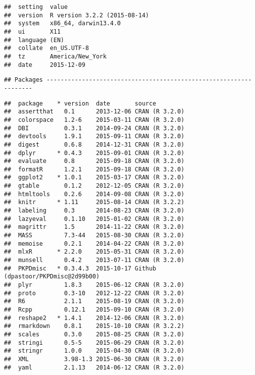 \documentclass[]{article}
\begin{document}
\begin{verbatim}
##  setting  value                       
##  version  R version 3.2.2 (2015-08-14)
##  system   x86_64, darwin13.4.0        
##  ui       X11                         
##  language (EN)                        
##  collate  en_US.UTF-8                 
##  tz       America/New_York            
##  date     2015-12-09
\end{verbatim}

\begin{verbatim}
## Packages ------------------------------------------------------------------
\end{verbatim}

\begin{verbatim}
##  package    * version  date       source                            
##  assertthat   0.1      2013-12-06 CRAN (R 3.2.0)                    
##  colorspace   1.2-6    2015-03-11 CRAN (R 3.2.0)                    
##  DBI          0.3.1    2014-09-24 CRAN (R 3.2.0)                    
##  devtools     1.9.1    2015-09-11 CRAN (R 3.2.0)                    
##  digest       0.6.8    2014-12-31 CRAN (R 3.2.0)                    
##  dplyr      * 0.4.3    2015-09-01 CRAN (R 3.2.0)                    
##  evaluate     0.8      2015-09-18 CRAN (R 3.2.0)                    
##  formatR      1.2.1    2015-09-18 CRAN (R 3.2.0)                    
##  ggplot2    * 1.0.1    2015-03-17 CRAN (R 3.2.0)                    
##  gtable       0.1.2    2012-12-05 CRAN (R 3.2.0)                    
##  htmltools    0.2.6    2014-09-08 CRAN (R 3.2.0)                    
##  knitr      * 1.11     2015-08-14 CRAN (R 3.2.2)                    
##  labeling     0.3      2014-08-23 CRAN (R 3.2.0)                    
##  lazyeval     0.1.10   2015-01-02 CRAN (R 3.2.0)                    
##  magrittr     1.5      2014-11-22 CRAN (R 3.2.0)                    
##  MASS         7.3-44   2015-08-30 CRAN (R 3.2.0)                    
##  memoise      0.2.1    2014-04-22 CRAN (R 3.2.0)                    
##  mlxR       * 2.2.0    2015-05-31 CRAN (R 3.2.0)                    
##  munsell      0.4.2    2013-07-11 CRAN (R 3.2.0)                    
##  PKPDmisc   * 0.3.4.3  2015-10-17 Github (dpastoor/PKPDmisc@2d99b00)
##  plyr         1.8.3    2015-06-12 CRAN (R 3.2.0)                    
##  proto        0.3-10   2012-12-22 CRAN (R 3.2.0)                    
##  R6           2.1.1    2015-08-19 CRAN (R 3.2.0)                    
##  Rcpp         0.12.1   2015-09-10 CRAN (R 3.2.0)                    
##  reshape2   * 1.4.1    2014-12-06 CRAN (R 3.2.0)                    
##  rmarkdown    0.8.1    2015-10-10 CRAN (R 3.2.2)                    
##  scales       0.3.0    2015-08-25 CRAN (R 3.2.0)                    
##  stringi      0.5-5    2015-06-29 CRAN (R 3.2.0)                    
##  stringr      1.0.0    2015-04-30 CRAN (R 3.2.0)                    
##  XML          3.98-1.3 2015-06-30 CRAN (R 3.2.0)                    
##  yaml         2.1.13   2014-06-12 CRAN (R 3.2.0)
\end{verbatim}
\end{document}
